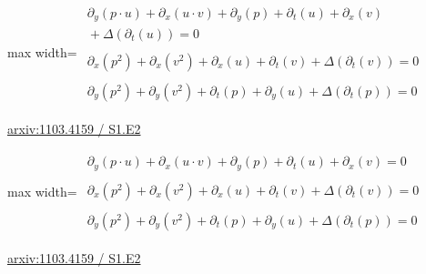 \documentclass[10pt,a4paper]{article}
\begin{document}
\begin{minipage}{\linewidth}
\begin{center}\begin{adjustbox}{max width=\linewidth}$\displaystyle\begin{gathered}\begin{gathered}\partial_{y}(p\cdot u)+\partial_{x}(u\cdot v)+\partial_{y}(p)+\partial_{t}(u)+\partial_{x}(v)\\[-1pt]{}+\Delta(\partial_{t}(u))=0\end{gathered}\\[5pt]\begin{gathered}\partial_{x}(p^{2})+\partial_{x}(v^{2})+\partial_{x}(u)+\partial_{t}(v)+\Delta(\partial_{t}(v))=0\end{gathered}\\[5pt]\begin{gathered}\partial_{y}(p^{2})+\partial_{y}(v^{2})+\partial_{t}(p)+\partial_{y}(u)+\Delta(\partial_{t}(p))=0\end{gathered}\end{gathered}$\end{adjustbox}\end{center}
{\small \href{https://arxiv.org/html/1103.4159#S1.E2}{arxiv:1103.4159 / S1.E2}}\par
\end{minipage}\par\vspace{7mm}

\begin{minipage}{\linewidth}
\begin{center}\begin{adjustbox}{max width=\linewidth}$\displaystyle\begin{gathered}\begin{gathered}\partial_{y}(p\cdot u)+\partial_{x}(u\cdot v)+\partial_{y}(p)+\partial_{t}(u)+\partial_{x}(v)=0\end{gathered}\\[5pt]\begin{gathered}\partial_{x}(p^{2})+\partial_{x}(v^{2})+\partial_{x}(u)+\partial_{t}(v)+\Delta(\partial_{t}(v))=0\end{gathered}\\[5pt]\begin{gathered}\partial_{y}(p^{2})+\partial_{y}(v^{2})+\partial_{t}(p)+\partial_{y}(u)+\Delta(\partial_{t}(p))=0\end{gathered}\end{gathered}$\end{adjustbox}\end{center}
{\small \href{https://arxiv.org/html/1103.4159#S1.E2}{arxiv:1103.4159 / S1.E2}}\par
\end{minipage}\par\vspace{7mm}
\end{document}
